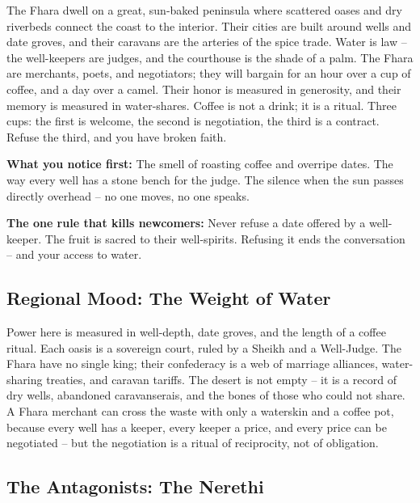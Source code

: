 \vspace{2mm}
\begin{tcolorbox}[colback=black!3,colframe=blue!60!black,title={Theme \& Atmosphere},breakable]
The Fhara dwell on a great, sun-baked peninsula where scattered oases and dry riverbeds connect the coast to the interior. Their cities are built around wells and date groves, and their caravans are the arteries of the spice trade. Water is law -- the well-keepers are judges, and the courthouse is the shade of a palm. The Fhara are merchants, poets, and negotiators; they will bargain for an hour over a cup of coffee, and a day over a camel. Their honor is measured in generosity, and their memory is measured in water-shares. Coffee is not a drink; it is a ritual. Three cups: the first is welcome, the second is negotiation, the third is a contract. Refuse the third, and you have broken faith.

\vspace{2mm}
\textbf{What you notice first:} The smell of roasting coffee and overripe dates. The way every well has a stone bench for the judge. The silence when the sun passes directly overhead -- no one moves, no one speaks.

\textbf{The one rule that kills newcomers:} Never refuse a date offered by a well-keeper. The fruit is sacred to their well-spirits. Refusing it ends the conversation -- and your access to water.
\end{tcolorbox}

\subsection*{Regional Mood: The Weight of Water}

Power here is measured in well-depth, date groves, and the length of a coffee ritual. Each oasis is a sovereign court, ruled by a Sheikh and a Well-Judge. The Fhara have no single king; their confederacy is a web of marriage alliances, water-sharing treaties, and caravan tariffs. The desert is not empty -- it is a record of dry wells, abandoned caravanserais, and the bones of those who could not share. A Fhara merchant can cross the waste with only a waterskin and a coffee pot, because every well has a keeper, every keeper a price, and every price can be negotiated -- but the negotiation is a ritual of reciprocity, not of obligation.

\subsection*{The Antagonists: The Nerethi}
\label{subsec:nerethi}

